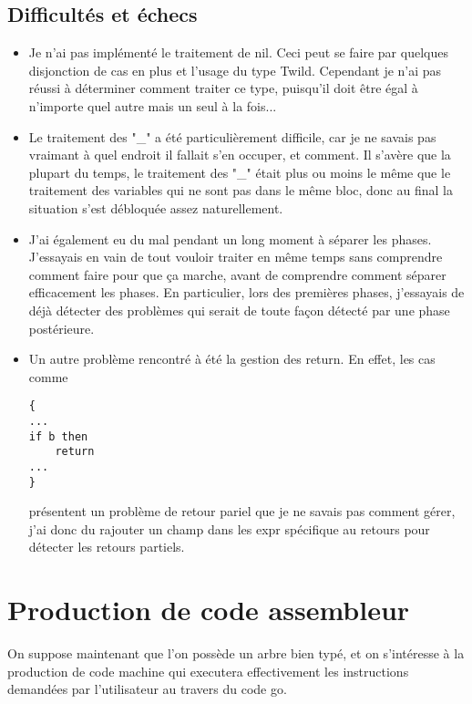 \documentclass{article}
\begin{document}
\subsection{Difficultés et échecs}

\begin{itemize}
\item Je n'ai pas implémenté le traitement de nil. Ceci peut se faire par quelques disjonction de cas en plus et l'usage du type Twild. Cependant je n'ai pas réussi à déterminer comment traiter ce type, puisqu'il doit être égal à n'importe quel autre mais un seul à la fois...\newline
\item Le traitement des "\_" a été particulièrement difficile, car je ne savais pas vraimant à quel endroit il fallait s'en occuper, et comment. Il s'avère que la plupart du temps, le traitement des "\_" était plus ou moins le même que le traitement des variables qui ne sont pas dans le même bloc, donc au final la situation s'est débloquée assez naturellement.\newline
\item J'ai également eu du mal pendant un long moment à séparer les phases. J'essayais en vain de tout vouloir traiter en même temps sans comprendre comment faire pour que ça marche, avant de comprendre comment séparer efficacement les phases. En particulier, lors des premières phases, j'essayais de déjà détecter des problèmes qui serait de toute façon détecté par une phase postérieure.\newline\newline\newline
\item Un autre problème rencontré à été la gestion des return. En effet, les cas comme 
\begin{lstlisting}
{
...
if b then
    return
...
}
\end{lstlisting}
présentent un problème de retour pariel que je ne savais pas comment gérer, j'ai donc du rajouter un champ dans les expr spécifique au retours pour détecter les retours partiels.
\end{itemize}



\section{Production de code assembleur}

On suppose maintenant que l'on possède un arbre bien typé, et on s'intéresse à la production de code machine qui executera effectivement les instructions demandées par l'utilisateur au travers du code go.
\end{document}

